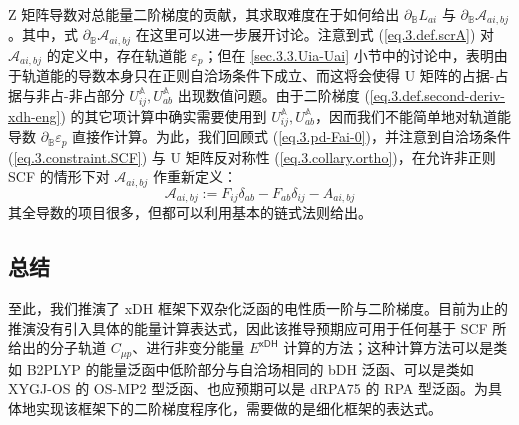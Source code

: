Z 矩阵导数对总能量二阶梯度的贡献，其求取难度在于如何给出 $\partial_{\mathbb{B}} L_{ai}$ 与 $\partial_{\mathbb{B}} \mathscr{A}_{ai, bj}$。其中，式 $\partial_{\mathbb{B}} \mathscr{A}_{ai, bj}$ 在这里可以进一步展开讨论。注意到式 (\ref{eq.3.def.scrA}) 对 $\mathscr{A}_{ai, bj}$ 的定义中，存在轨道能 $\varepsilon_p$；但在 \ref{sec.3.3.Uia-Uai} 小节中的讨论中，表明由于轨道能的导数本身只在正则自洽场条件下成立、而这将会使得 U 矩阵的占据-占据与非占-非占部分 $U_{ij}^{\mathbb{A}}, U_{ab}^{\mathbb{A}}$ 出现数值问题。由于二阶梯度 (\ref{eq.3.def.second-deriv-xdh-eng}) 的其它项计算中确实需要使用到 $U_{ij}^{\mathbb{A}}, U_{ab}^{\mathbb{A}}$，因而我们不能简单地对轨道能导数 $\partial_{\mathbb{B}} \varepsilon_p$ 直接作计算。为此，我们回顾式 (\ref{eq.3.pd-Fai-0})，并注意到自洽场条件 (\ref{eq.3.constraint.SCF}) 与 U 矩阵反对称性 (\ref{eq.3.collary.ortho})，在允许非正则 SCF 的情形下对 $\mathscr{A}_{ai, bj}$ 作重新定义：
\begin{equation}
  \label{eq.3.def.scrA-noncanonical}
  \mathscr{A}_{ai, bj} := F_{ij} \delta_{ab} - F_{ab} \delta_{ij} - A_{ai, bj}
\end{equation}
其全导数的项目很多，但都可以利用基本的链式法则给出。

\subsection{总结}

至此，我们推演了 xDH 框架下双杂化泛函的电性质一阶与二阶梯度。目前为止的推演没有引入具体的能量计算表达式，因此该推导预期应可用于任何基于 SCF 所给出的分子轨道 $C_{\mu p}$、进行非变分能量 $E^\textsf{xDH}$ 计算的方法；这种计算方法可以是类如 B2PLYP 的能量泛函中低阶部分与自洽场相同的 bDH 泛函、可以是类如 XYGJ-OS 的 OS-MP2 型泛函、也应预期可以是 dRPA75 的 RPA 型泛函。为具体地实现该框架下的二阶梯度程序化，需要做的是细化框架的表达式。

